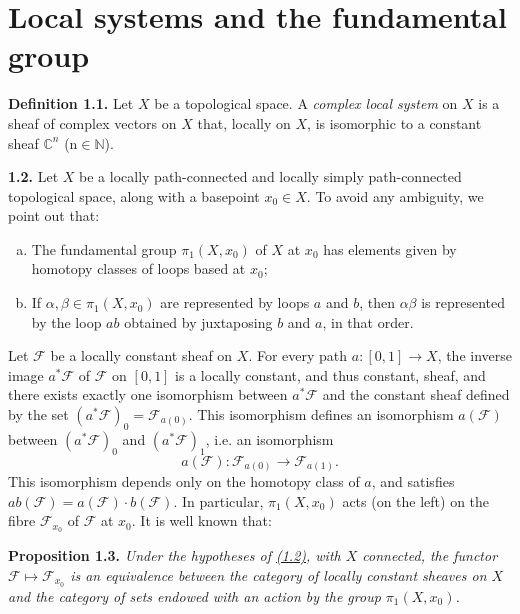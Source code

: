 \documentclass{report}
\newenvironment{itenv}[1]
  {\phantomsection\par\medskip\noindent\textbf{#1.}\itshape}
  {\par\medskip}
\newenvironment{rmenv}[1]
  {\phantomsection\par\medskip\noindent\textbf{#1.}\rmfamily}
  {\par\medskip}
\newcommand{\scr}[1]{{\mathscr{#1}}}
\begin{document}
\section{Local systems and the fundamental group}
\label{I.1}

\begin{rmenv}{Definition 1.1}
\label{I.1.1}
  Let $X$ be a topological space.
  A \emph{complex local system} on $X$ is a sheaf of complex vectors on $X$ that, locally on $X$, is isomorphic to a constant sheaf $\mathbb{C}^n$ (n$\in\mathbb{N}$).
\end{rmenv}

\begin{rmenv}{1.2}
\label{I.1.2}
  Let $X$ be a locally path-connected and locally simply path-connected topological space, along with a basepoint $x_0\in X$.
  To avoid any ambiguity, we point out that:
  \begin{enumerate}[a)]
    \item The fundamental group $\pi_1(X,x_0)$ of $X$ at $x_0$ has elements given by homotopy classes of loops based at $x_0$;
    \item If $\alpha,\beta\in\pi_1(X,x_0)$ are represented by loops $a$ and $b$, then $\alpha\beta$ is represented by the loop $ab$ obtained by juxtaposing $b$ and $a$, in that order.
  \end{enumerate}

  Let $\scr{F}$ be a locally constant sheaf on $X$.
  For every path $a\colon[0,1]\to X$, the inverse image $a^*\scr{F}$ of $\scr{F}$ on $[0,1]$ is a locally constant, and thus constant, sheaf, and there exists exactly one isomorphism between $a^*\scr{F}$ and the constant sheaf defined by the set $(a^*\scr{F})_0 = \scr{F}_{a(0)}$.
  This isomorphism defines an isomorphism $a(\scr{F})$ between $(a^*\scr{F})_0$ and $(a^*\scr{F})_1$, i.e. an isomorphism
  \[
    a(\scr{F})\colon \scr{F}_{a(0)} \to \scr{F}_{a(1)}.
  \]
  This isomorphism depends only on the homotopy class of $a$, and satisfies $ab(\scr{F}) = a(\scr{F})\cdot b(\scr{F})$.
  In particular, $\pi_1(X,x_0)$ acts (on the left) on the fibre $\scr{F}_{x_0}$ of $\scr{F}$ at $x_0$.
  It is well known that:
\end{rmenv}

\begin{itenv}{Proposition 1.3}
\label{I.1.3}
  Under the hypotheses of \hyperref[I.1.2]{(1.2)}, with $X$ connected, the functor $\scr{F}\mapsto\scr{F}_{x_0}$ is an equivalence between the category of locally constant sheaves on $X$ and the category of sets endowed with an action by the group $\pi_1(X,x_0)$.
\end{itenv}
\end{document}
